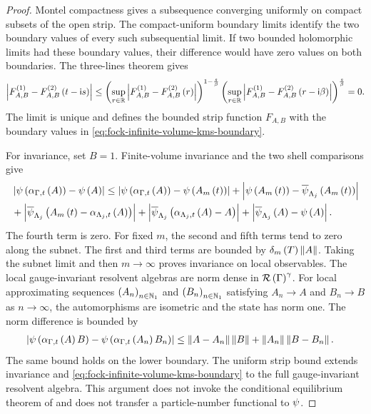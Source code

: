 \documentclass[11pt,a4paper]{article}
\theoremstyle{plain}
\theoremstyle{definition}
\theoremstyle{remark}
\begin{document}
\begin{proof}
Montel compactness gives a subsequence converging uniformly on compact subsets of the open strip.
The compact-uniform boundary limits identify the two boundary values of every such subsequential limit.
If two bounded holomorphic limits had these boundary values, their difference would have zero values on both
boundaries.
The three-lines theorem gives
$$\begin{aligned}
\abs{\fun{F_{A,B}^{(1)}-F_{A,B}^{(2)}}{t-\imunit s}}
\leq
\rbk{
\sup_{r\in\fldreal}
\abs{\fun{F_{A,B}^{(1)}-F_{A,B}^{(2)}}{r}}}^{1-\frac{s}{\beta}}
\rbk{
\sup_{r\in\fldreal}
\abs{\fun{F_{A,B}^{(1)}-F_{A,B}^{(2)}}{r-\imunit\beta}}}^{\frac{s}{\beta}}
=
0.
\end{aligned}$$
The limit is unique and defines the bounded strip function $F_{A,B}$ with the boundary values in
\eqref{eq:fock-infinite-volume-kms-boundary}.

For invariance, set $B=1$.
Finite-volume invariance and the two shell comparisons give
$$\begin{aligned}
&
\abs{
\fun{\oastate[\psi]}{\fun{\alpha_{\Gamma,t}}{A}}
-
\fun{\oastate[\psi]}{A}}
\leq
\abs{
\fun{\oastate[\psi]}{\fun{\alpha_{\Gamma,t}}{A}}
-
\fun{\oastate[\psi]}{\fun{A_m}{t}}}
+
\abs{
\fun{\oastate[\psi]}{\fun{A_m}{t}}
-
\fun{\oastate[\overline{\psi}_{\Lambda_j}]}{\fun{A_m}{t}}}
\\
&
+
\abs{
\fun{\oastate[\overline{\psi}_{\Lambda_j}]}{
\fun{A_m}{t}-\fun{\alpha_{\Lambda_j,t}}{A}}}
+
\abs{
\fun{\oastate[\overline{\psi}_{\Lambda_j}]}{
\fun{\alpha_{\Lambda_j,t}}{A}-A}}
+
\abs{
\fun{\oastate[\overline{\psi}_{\Lambda_j}]}{A}
-
\fun{\oastate[\psi]}{A}}.
\end{aligned}$$
The fourth term is zero.
For fixed $m$, the second and fifth terms tend to zero along the subnet.
The first and third terms are bounded by $\delta_m \left( T \right)\left\Vert A \right\Vert$.
Taking the subnet limit and then $m\to\infty$ proves invariance on local observables.
The local gauge-invariant resolvent algebras are norm dense in
$\mathcal{R} \left( \Gamma \right)^{\gamma}$.
For local approximating sequences
$\seq{A_n}{n\in\semigrposint}$ and $\seq{B_n}{n\in\semigrposint}$ satisfying
$A_n\to A$ and $B_n\to B$ as $n\to\infty$, the automorphisms are isometric and the state has norm one.
The norm difference is bounded by
$$\begin{aligned}
\abs{
\fun{\oastate[\psi]}{\fun{\alpha_{\Gamma,t}}{A}B}
-
\fun{\oastate[\psi]}{\fun{\alpha_{\Gamma,t}}{A_n}B_n}}
& \leq
\norm{A-A_n}\norm{B}
+
\norm{A_n}\norm{B-B_n}.
\end{aligned}$$
The same bound holds on the lower boundary.
The uniform strip bound extends invariance and
\eqref{eq:fock-infinite-volume-kms-boundary} to the full gauge-invariant resolvent algebra.
This argument does not invoke the conditional equilibrium theorem of \cite{DeuchertLampartLemm001} and does not
transfer a particle-number functional to $\oastate[\psi]$.
\end{proof}
\end{document}
